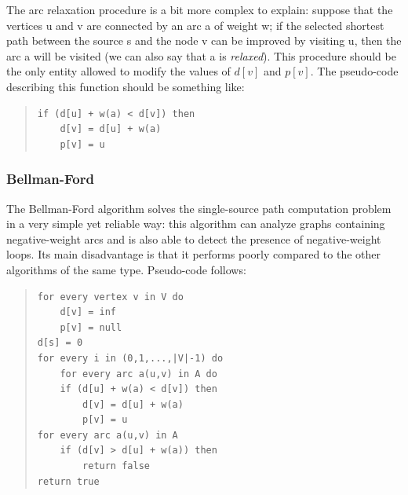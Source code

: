 \documentclass[10pt,a4paper]{report}
\begin{document}
\begin{itemize}
  The arc relaxation procedure is a bit more complex to explain:
  suppose that the vertices u and v are connected by an arc a of
  weight w; if the selected shortest path between the source s and the
  node v can be improved by visiting u, then the arc a will be visited
  (we can also say that a is \textit{relaxed}). This procedure should
  be the only entity allowed to modify the values of \(d[v]\) and
  \(p[v]\). The pseudo-code describing this function should be
  something like:
  \begin{quote}
    \begin{lstlisting}
if (d[u] + w(a) < d[v]) then
    d[v] = d[u] + w(a)
    p[v] = u
    \end{lstlisting}
  \end{quote}
\end{itemize}

\subsubsection{Bellman-Ford}

The Bellman-Ford algorithm solves the single-source path computation
problem in a very simple yet reliable way: this algorithm can analyze
graphs containing negative-weight arcs and is also able to detect the
presence of negative-weight loops. Its main disadvantage is that it
performs poorly compared to the other algorithms of the same
type. Pseudo-code follows:
\begin{quote}
\begin{lstlisting}
for every vertex v in V do
    d[v] = inf
    p[v] = null
d[s] = 0
for every i in (0,1,...,|V|-1) do
    for every arc a(u,v) in A do
    if (d[u] + w(a) < d[v]) then
        d[v] = d[u] + w(a)
        p[v] = u
for every arc a(u,v) in A
    if (d[v] > d[u] + w(a)) then
        return false
return true
\end{lstlisting}
\end{quote}
\end{document}
